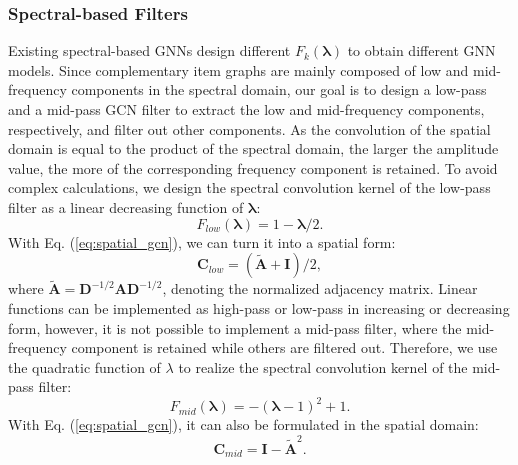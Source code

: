 \documentclass[letterpaper]{article} %
\begin{document}
\subsubsection{Spectral-based Filters}
Existing spectral-based GNNs \cite{bruna2013spectral, defferrard2016convolutional, kipf2016semi} design different $F_{k}(\mathbf{\lambda})$ to obtain different GNN models. Since complementary item graphs are mainly composed of low and mid-frequency components in the spectral domain, our goal is to design a low-pass and a mid-pass GCN filter to extract the low and mid-frequency components, respectively, and filter out other components.
 As the convolution of the spatial domain is equal to the product of the spectral domain, the larger the amplitude value, the more of the corresponding frequency component is retained. To avoid complex calculations, we design the spectral convolution kernel of the low-pass filter as a linear decreasing function of $\mathbf{\lambda}$:
\begin{equation}
    F_{low}(\mathbf{\lambda})=1-\mathbf{\lambda}/2.
\end{equation}
With Eq. (\ref{eq:spatial_gcn}), we can turn it into a spatial form:
\begin{equation}
    \mathbf{C}_{low}=(\mathbf{\widetilde{A}}+\mathbf{I})/2,
    \label{eq:low_pass}
\end{equation}
where $\mathbf{\widetilde{A}}=\mathbf{D}^{-1/2}\mathbf{A}\mathbf{D}^{-1/2}$, denoting the normalized adjacency matrix.
Linear functions can be implemented as high-pass or low-pass in increasing or decreasing form, however, it is not possible to implement a mid-pass filter, where the mid-frequency component is retained while others are filtered out. Therefore, we use the quadratic function of $\lambda$ to realize the spectral convolution kernel of the mid-pass filter:
\begin{equation}
    F_{mid}(\mathbf{\lambda})=-(\mathbf{\lambda}-1)^2+1.
\end{equation}
With Eq. (\ref{eq:spatial_gcn}), it can also be formulated in the spatial domain:
\begin{equation}
    \mathbf{C}_{mid}=\mathbf{I}-\mathbf{\widetilde{A}}^2.
    \label{eq:mid_pass}
\end{equation}
\end{document}
